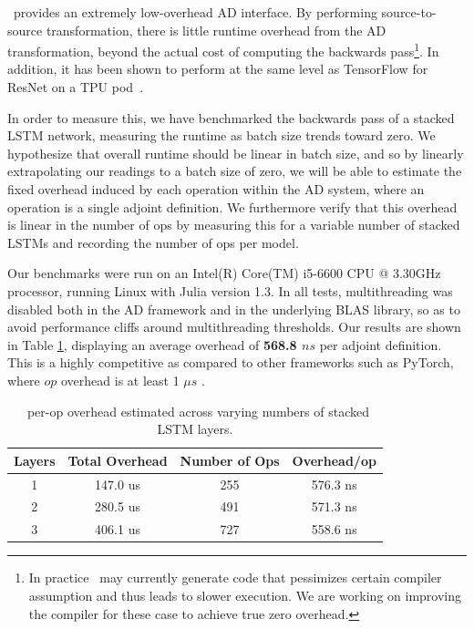 \documentclass{juliacon}
\newcommand{\Zygote}{\iftoggle{anonymous}{$\partial$P.jl}{Zygote}}
\begin{document}
\Zygote\ provides an extremely low-overhead AD interface. By performing source-to-source transformation, there is little runtime overhead from the AD transformation, beyond the actual cost of computing the backwards pass\footnote{In practice \Zygote\ may currently generate code that pessimizes certain compiler assumption and thus leads to slower execution. We are working on improving the compiler for these case to achieve true zero overhead.}. In addition, it has been shown to perform at the same level as TensorFlow for ResNet on a TPU pod~\cite{xla.jl}.

In order to measure this, we have benchmarked the backwards pass of a stacked LSTM network, measuring the runtime as batch size trends toward zero. We hypothesize that overall runtime should be linear in batch size, and so by linearly extrapolating our readings to a batch size of zero, we will be able to estimate the fixed overhead induced by each operation within the AD system, where an operation is a single adjoint definition.  We furthermore verify that this overhead is linear in the number of ops by measuring this for a variable number of stacked LSTMs and recording the number of ops per model.

Our benchmarks were run on an Intel(R) Core(TM) i5-6600 CPU @ 3.30GHz processor, running Linux with Julia version 1.3.  In all tests, multithreading was disabled both in the AD framework and in the underlying BLAS library, so as to avoid performance cliffs around multithreading thresholds. Our results are shown in Table \ref{table:zygote_overhead}, displaying an average overhead of \textbf{568.8 $ns$} per adjoint definition. This is a highly competitive as compared to other frameworks such as PyTorch, where $op$ overhead is at least 1 $\mu s$ \cite{PyTorchYear}.

\begin{table}[]
\centering
\begin{tabular}{cccc}
Layers & Total Overhead & Number of Ops & Overhead/op \\ \hline
1      & 147.0 us & 255 & 576.3 ns \\
2      & 280.5 us & 491 & 571.3 ns \\ 
3      & 406.1 us & 727 & 558.6 ns \\ \hline
\end{tabular}
\label{table:zygote_overhead}
\caption{\Zygote\ per-op overhead estimated across varying numbers of stacked LSTM layers.}
\end{table}
\end{document}
